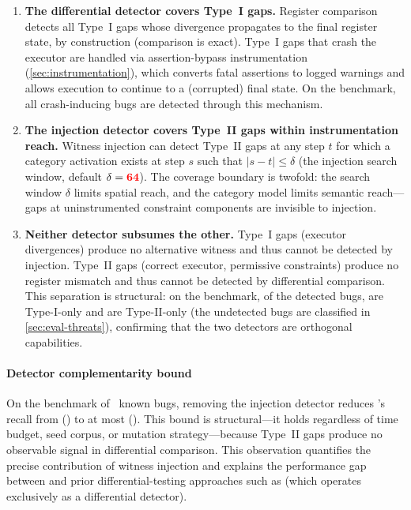 \begin{enumerate}
    \item \textbf{The differential detector covers Type~I gaps.} Register comparison detects all Type~I gaps whose divergence propagates to the final register state, by construction (comparison is exact). Type~I gaps that crash the executor are handled via assertion-bypass instrumentation (\autoref{sec:instrumentation}), which converts fatal assertions to logged warnings and allows execution to continue to a (corrupted) final state. On the benchmark, all crash-inducing bugs are detected through this mechanism.

    \item \textbf{The injection detector covers Type~II gaps within instrumentation reach.} Witness injection can detect Type~II gaps at any step $t$ for which a category activation exists at step $s$ such that $|s - t| \leq \delta$ (the injection search window, default $\delta = {{\color{red}{{{\bf 64}}}}}$). The coverage boundary is twofold: the search window $\delta$ limits spatial reach, and the category model limits semantic reach---gaps at uninstrumented constraint components are invisible to injection.

    \item \textbf{Neither detector subsumes the other.} Type~I gaps (executor divergences) produce no alternative witness and thus cannot be detected by injection. Type~II gaps (correct executor, permissive constraints) produce no register mismatch and thus cannot be detected by differential comparison. This separation is structural: on the benchmark, of the  detected bugs,  are Type-I-only and  are Type-II-only (the  undetected bugs are classified in \autoref{sec:eval-threats}), confirming that the two detectors are orthogonal capabilities.\label{item:separation}
\end{enumerate}

\paragraph{Detector complementarity bound}\label{cor:complementarity}
On the benchmark of ~known bugs, removing the injection detector reduces \tool's recall from  () to at most  (). This bound is structural---it holds regardless of time budget, seed corpus, or mutation strategy---because Type~II gaps produce no observable signal in differential comparison. This observation quantifies the precise contribution of witness injection and explains the performance gap between \tool and prior differential-testing approaches such as \arguzz (which operates exclusively as a differential detector).

